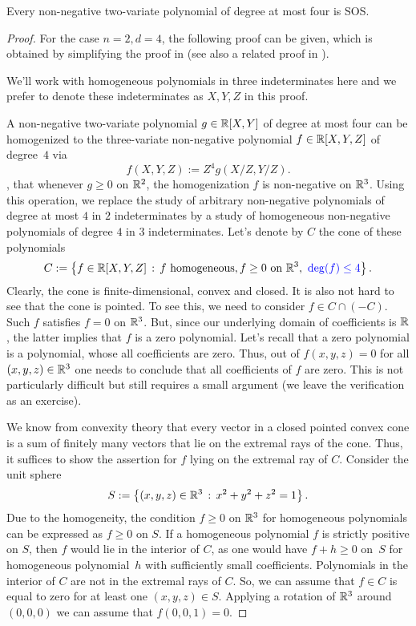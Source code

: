 \begin{theorem}[Hilbert]
	\label{thm:ternary:quartics}
	Every non-negative two-variate polynomial of degree at most four is SOS. 
\end{theorem}
\begin{proof}
	For the case $n=2, d=4$, the following proof can be given, which is obtained by simplifying the proof in \cite{Pfister:Scheiderer:2012} (see also a related proof in \cite[Prop.~6.3.4]{Bochnak:Coste:Roy:1998}). 
	
	We'll work with homogeneous polynomials in three indeterminates here and we prefer to denote these indeterminates as $X, Y, Z$ in this proof. 
	
	A non-negative two-variate polynomial $g \in \mathbb{R}[X,Y]$ of degree at most four can be homogenized to the three-variate non-negative polynomial $f \in \mathbb{R}[X,Y,Z]$ of degree~$4$ via
	\[
		f(X,Y,Z) := Z^4 g(X/Z,Y/Z).
	\]
, that whenever $g \ge 0$ on $\mathbb{R}^2$, the homogenization $f$ is non-negative on $\mathbb{R}^3$. Using this operation, we replace the study of arbitrary non-negative polynomials of degree at most $4$ in $2$ indeterminates by a study of homogeneous non-negative polynomials of degree  $4$ in $3$ indeterminates. Let's denote by $C$ the cone of these polynomials 
	\[
		C:= \setcond{ f \in \R[X,Y,Z]}{f \ \text{homogeneous}, f \ge 0 \ \text{on} \ \R^3, \ \blue{\deg(f) \leq 4}}.
	\]
	Clearly, the cone is finite-dimensional, convex and closed. It is also not hard to see that the cone is pointed. To see this, we need to consider $f \in C \cap (-C)$. Such $f$ satisfies $f=0$ on $\mathbb{R}^3$. But, since our underlying domain of coefficients is $\mathbb{R}$,  the latter implies that $f$ is a zero polynomial. Let's recall that a zero polynomial is a polynomial, whose all coefficients are zero. Thus, out of $f(x,y,z) =0$ for all $(x,y,z) \in \mathbb{R}^3$ one needs to conclude that all coefficients of $f$ are zero. This is not particularly difficult but still requires a small argument (we leave the verification as an exercise). 
	
	We know from convexity theory that every vector in a closed pointed convex cone is a sum of finitely many vectors that lie on the extremal rays of the cone. Thus, it suffices to show the assertion for $f$ lying on the extremal ray of $C$.	Consider the unit sphere 
	\[
		S := \left\{ (x,y,z) \in \mathbb{R}^3 \,:\, x^2 + y^2 + z^2 = 1 \right\}.
	\]
	Due to the homogeneity, the condition $f \ge 0$ on $\mathbb{R}^3$ for homogeneous polynomials can be expressed as $f \ge 0$ on $S$. If a homogeneous polynomial $f$ is strictly positive on $S$, then $f$ would lie in the interior of $C$, as one would have $f+ h \ge 0$ on~$S$ for  homogeneous polynomial~$h$ with sufficiently small coefficients. Polynomials in the interior of $C$ are not  in the extremal rays of $C$. So, we can assume that $f \in C$ is equal to zero for at least one $(x,y,z) \in S$. Applying a rotation of $\mathbb{R}^3$ around $(0,0,0)$ we can assume that $f(0,0,1) = 0$. 
	

\end{proof}
